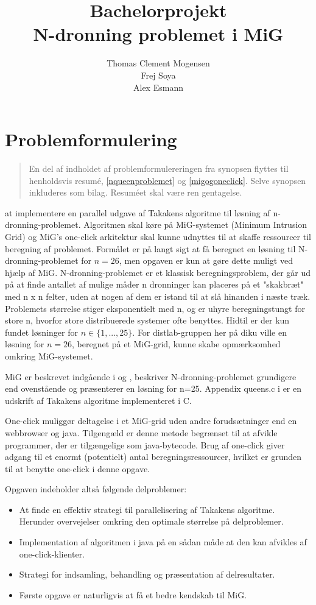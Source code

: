 \documentclass[draft,a4paper,10pt]{article}
\title{Bachelorprojekt\\N-dronning problemet i MiG}
\author{Thomas Clement Mogensen \\ Frej Soya \\ Alex Esmann }
\begin{document}
\maketitle
\tableofcontents



\newpage
\setcounter{page}{1}
\section{Problemformulering}\label{problemformulering}
\begin{verse}
	En del af indholdet af problemformulereringen fra synopsen flyttes til henholdsvis resumé, \ref{nqueenproblemet} og \ref{migogoneclick}. Selve synopsen inkluderes som bilag. Resuméet skal være ren gentagelse.
\end{verse}
%
at implementere en parallel udgave af Takakens algoritme til løsning af n-dronning-problemet. Algoritmen skal køre på MiG-systemet (Minimum Intrusion Grid) og MiG's one-click arkitektur skal kunne udnyttes til at skaffe ressourcer til beregning af problemet. Formålet er på langt sigt at få beregnet en løsning til N-dronning-problemet for $n=26$, men opgaven er kun at gøre dette muligt ved hjælp af MiG. N-dronning-problemet er et klassisk beregningsproblem, der går ud på at finde antallet af mulige måder n dronninger kan placeres på et "skakbræt" med n x n felter, uden at nogen af dem er istand til at slå hinanden i næste træk. Problemets størrelse stiger eksponentielt med n, og er uhyre beregningstungt for store n, hvorfor store distribuerede systemer ofte benyttes. Hidtil er der kun fundet løsninger for $n \in \{1,...,25\}$. For distlab-gruppen her på diku ville en løsning for $n=26$, beregnet på et MiG-grid, kunne skabe opmærksomhed omkring MiG-systemet.

MiG er beskrevet indgående i \cite{simplemig} og \cite{mig}, \cite{etsi} beskriver N-dronning-problemet grundigere end ovenstående og præsenterer en løsning for n=25. Appendix queens.c i \cite{etsi} er en udskrift af Takakens algoritme implementeret i C.

One-click muliggør deltagelse i et MiG-grid uden andre forudsætninger end en webbrowser og java. Tilgengæld er denne metode begrænset til at afvikle programmer, der er tilgængelige som java-bytecode. Brug af one-click giver adgang til et enormt (potentielt) antal beregningsressourcer, hvilket er grunden til at benytte one-click i denne opgave.

Opgaven indeholder altså følgende delproblemer:
\begin{itemize}
\item At finde en effektiv strategi til parallelisering af Takakens algoritme. Herunder overvejelser omkring den optimale størrelse på delproblemer.
\item Implementation af algoritmen i java på en sådan måde at den kan afvikles af one-click-klienter.
\item Strategi for indsamling, behandling og præsentation af delresultater.
\item Første opgave er naturligvis at få et bedre kendskab til MiG.
\end{itemize}
\end{document}
